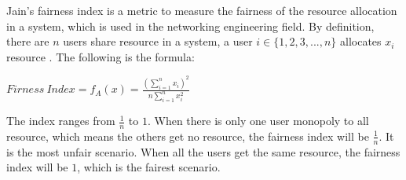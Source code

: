 Jain's fairness index is a metric to measure the fairness of the resource allocation in a system, which is used in the networking engineering field. By definition, there are $n$ users share resource in a system, a user $i \in \{1,2,3,...,n\}$ allocates $x_i$ resource \cite{jain_quantitative_1998}. The following is the formula:

$Firness\ Index = f_A(x) = \frac{\left(\sum\limits_{i=1}^{n} x_i\right)^2}{n \sum\limits_{i=1}^{n} x_i^2}$

The index ranges from $\frac{1}{n}$ to $1$. When there is only one user monopoly to all resource, which means the others get no resource, the fairness index will be $\frac{1}{n}$. It is the most unfair scenario. When all the users get the same resource, the fairness index will be $1$, which is the fairest scenario.